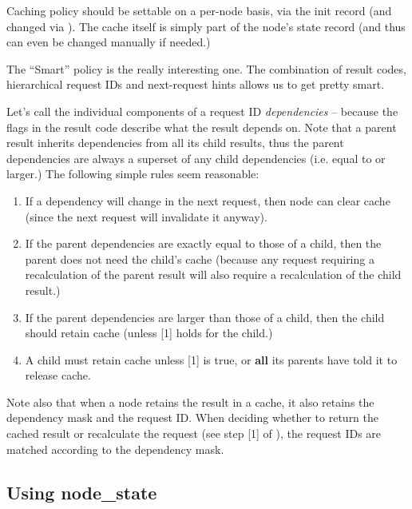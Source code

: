 \documentclass[10pt]{article}
\begin{document}
  Caching policy should be settable on a per-node basis, via the init record
  (and changed via ). The cache itself is simply part of the
  node's state record (and thus can even be changed manually if needed.)
  
  The ``Smart'' policy is the really interesting one. The combination of result
  codes, hierarchical request IDs and next-request hints allows us to get
  pretty smart. 
  
  Let's call the individual components of a request ID {\em dependencies} --
  because the  flags in the result code describe what the result
  depends on. Note that a parent result inherits dependencies from all its
  child results, thus the parent dependencies are always a superset of any
  child dependencies (i.e. equal to or larger.) The following simple rules seem
  reasonable:

  \begin{enumerate}
  
  \item If a dependency will change in the next request, then node can clear
    cache (since the next request will invalidate it anyway).

  \item If the parent dependencies are exactly equal to those of a child, then
    the parent does not need the child's cache (because any request requiring a
    recalculation of the parent result will also require a recalculation of the
    child result.)

  \item If the parent dependencies are larger than those of a child, then the 
    child should retain cache (unless [1] holds for the child.) 

  \item A child must retain cache unless [1] is true, or {\bf all} its parents
    have told it to release cache.

  \end{enumerate}
  
  Note also that when a node retains the result in a cache, it also retains the
  dependency mask and the request ID. When deciding whether to return the
  cached result or recalculate the request (see step [1] of ),
  the request IDs are matched according to the dependency mask.
  
\subsection{Using node\_state}
\end{document}
